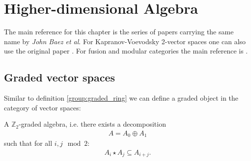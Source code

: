 \chapter{Higher-dimensional Algebra}

    The main reference for this chapter is the series of papers carrying the same name by \textit{John Baez et al}. For Kapranov-Voevodsky 2-vector spaces one can also use the original paper \cite{kapranov_voevodsky}. For fusion and modular categories the main reference is \cite{etingof}.

\section{Graded vector spaces}\label{section:graded_spaces}

    Similar to definition \ref{group:graded_ring} we can define a graded object in the category of vector spaces:



    \begin{example}[Superalgebra]\label{linalgebra:superalgebra}
        A $\mathbb{Z}_2$-graded algebra, i.e. there exists a decomposition
        \begin{gather}
            A = A_0\oplus A_1
        \end{gather}
        such that for all $i, j \mod 2$:
        \begin{gather}
            A_i\star A_j \subseteq A_{i+j}.
        \end{gather}
    \end{example}

